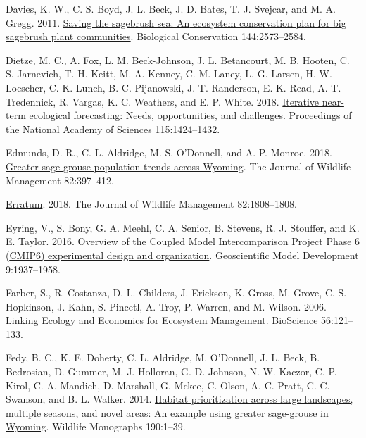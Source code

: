 \documentclass[
  12pt,
]{article}
\newlength{\cslhangindent}
\newlength{\cslentryspacingunit} %
\newenvironment{CSLReferences}[2] %
 {%
  \setlength{\parindent}{0pt}
  \ifodd #1
  \let\oldpar\par
  \def\par{\hangindent=\cslhangindent\oldpar}
  \fi
  \setlength{\parskip}{#2\cslentryspacingunit}
 }%
 {}
\begin{document}
\begin{CSLReferences}{1}{0}
\leavevmode{}%
Davies, K. W., C. S. Boyd, J. L. Beck, J. D. Bates, T. J. Svejcar, and M. A. Gregg. 2011. \href{https://doi.org/10.1016/j.biocon.2011.07.016}{Saving the sagebrush sea: {An} ecosystem conservation plan for big sagebrush plant communities}. Biological Conservation 144:2573--2584.

\leavevmode{}%
Dietze, M. C., A. Fox, L. M. Beck-Johnson, J. L. Betancourt, M. B. Hooten, C. S. Jarnevich, T. H. Keitt, M. A. Kenney, C. M. Laney, L. G. Larsen, H. W. Loescher, C. K. Lunch, B. C. Pijanowski, J. T. Randerson, E. K. Read, A. T. Tredennick, R. Vargas, K. C. Weathers, and E. P. White. 2018. \href{https://doi.org/10.1073/pnas.1710231115}{Iterative near-term ecological forecasting: {Needs}, opportunities, and challenges}. Proceedings of the National Academy of Sciences 115:1424--1432.

\leavevmode{}%
Edmunds, D. R., C. L. Aldridge, M. S. O'Donnell, and A. P. Monroe. 2018. \href{https://doi.org/10.1002/jwmg.21386}{Greater sage-grouse population trends across {Wyoming}}. The Journal of Wildlife Management 82:397--412.

\leavevmode{}%
\href{https://doi.org/10.1002/jwmg.21560}{Erratum}. 2018. The Journal of Wildlife Management 82:1808--1808.

\leavevmode{}%
Eyring, V., S. Bony, G. A. Meehl, C. A. Senior, B. Stevens, R. J. Stouffer, and K. E. Taylor. 2016. \href{https://doi.org/10.5194/gmd-9-1937-2016}{Overview of the {Coupled} {Model} {Intercomparison} {Project} {Phase} 6 ({CMIP6}) experimental design and organization}. Geoscientific Model Development 9:1937--1958.

\leavevmode{}%
Farber, S., R. Costanza, D. L. Childers, J. Erickson, K. Gross, M. Grove, C. S. Hopkinson, J. Kahn, S. Pincetl, A. Troy, P. Warren, and M. Wilson. 2006. \href{https://doi.org/10.1641/0006-3568(2006)056\%5B0121:LEAEFE\%5D2.0.CO;2}{Linking {Ecology} and {Economics} for {Ecosystem} {Management}}. BioScience 56:121--133.

\leavevmode{}%
Fedy, B. C., K. E. Doherty, C. L. Aldridge, M. O'Donnell, J. L. Beck, B. Bedrosian, D. Gummer, M. J. Holloran, G. D. Johnson, N. W. Kaczor, C. P. Kirol, C. A. Mandich, D. Marshall, G. Mckee, C. Olson, A. C. Pratt, C. C. Swanson, and B. L. Walker. 2014. \href{https://doi.org/10.1002/wmon.1014}{Habitat prioritization across large landscapes, multiple seasons, and novel areas: {An} example using greater sage-grouse in {Wyoming}}. Wildlife Monographs 190:1--39.


\end{CSLReferences}
\end{document}
